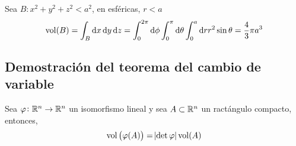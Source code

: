 \begin{example*}
    Sea $B: x^2 + y^2 + z^2 < a^2$, en esf\'ericas, $r < a$
    \[
        \vol(B) = \int_B \dif x \dif y \dif z = \int^{2\pi}_0 \dif \phi \int^\pi_0 \dif \theta \int^{a}_0  \dif r r^2 \sin\theta
        = \frac{4}{3} \pi a^3
    \]
\end{example*}

\subsection*{Demostración del teorema del cambio de variable}

\begin{lema*}[1]\label{lema:uno_cambio}
    Sea $\varphi \colon \mathbb{R}^n \to \mathbb{R}^n$ un isomorfismo lineal y sea $A \subset \mathbb{R}^n$ un ractángulo compacto, entonces,
    \[
        \operatorname{vol}\left( \varphi(A) \right) = \abs{\det \varphi} \operatorname{vol}(A)
    \]
\end{lema*}

